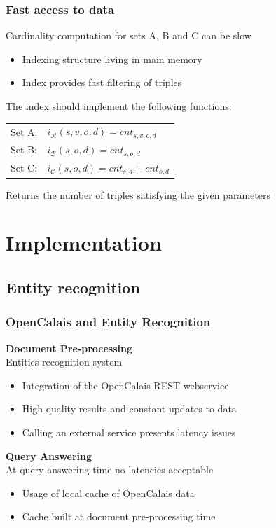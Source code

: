 \documentclass{beamer}
\begin{document}
\begin{frame}
\frametitle{Fast access to data}
Cardinality computation for sets A, B and C can be slow
\begin{itemize}
\item Indexing structure living in main memory
\item Index provides fast filtering of triples
\end{itemize}
\vspace{5mm}
The index should implement the following functions:\\
\vspace{2mm}
\begin{center}
\begin{tabular}{ll}
Set A: & $i_{\mathcal{A}} (s,v,o,d) = cnt_{s,v,o,d}$\\
Set B: & $i_{\mathcal{B}} (s,o,d) = cnt_{s,o,d}$\\
Set C: & $i_{\mathcal{C}} (s,o,d) = cnt_{s,d} + cnt_{o,d}$\\
\end{tabular}
\end{center}
\vspace{3mm}
Returns the number of triples satisfying the given parameters
\end{frame}

\section{Implementation}
\subsection{Entity recognition}

\begin{frame}
\frametitle{OpenCalais and Entity Recognition}
{\color{red}\bfseries{Document Pre-processing}}\\
Entities recognition system
\begin{itemize}
\item Integration of the OpenCalais REST webservice
\item High quality results and constant updates to data
\item Calling an external service presents latency issues
\end{itemize}
\bigskip
{\color{red}\bfseries{Query Answering}}\\
At query answering time no latencies acceptable
\begin{itemize}
\item Usage of local cache of OpenCalais data
\item Cache built at document pre-processing time
\end{itemize}
\end{frame}
\end{document}

